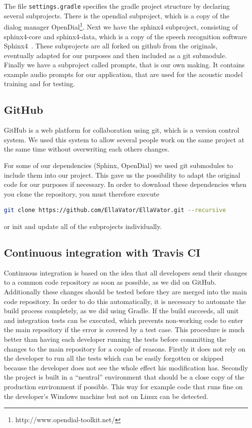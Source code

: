 \documentclass[a4paper, 12pt]{article}
\begin{document}
The file \texttt{settings.gradle} specifies the gradle project structure by declaring several subprojects.
There is the opendial subproject, which is a copy of the dialog manager OpenDial\footnote{http://www.opendial-toolkit.net/}.
Next we have the sphinx4 subproject, consisting of sphinx4-core and sphinx4-data, which is a copy of the speech recognition software Sphinx4~\cite{Walker:2004:SFO:1698193}.
These subprojects are all forked on github from the originals, eventually adapted for our purposes and then included as a git submodule.
Finally we have a subproject called prompts, that is our own making.
It contains example audio prompts for our application, that are used for the acoustic model training and for testing.

\subsection{GitHub}
GitHub is a web platform for collaboration using git, which is a version control system. 
We used this system to allow several people work on the same project at the same time without overwriting each others changes.

For some of our dependencies (Sphinx, OpenDial) we used git submodules to include them into our project. 
This gave us the possibility to adapt the original code for our purposes if necessary.
In order to download these dependencies when you clone the repository, you must therefore execute
\begin{lstlisting}[language=bash]
git clone https://github.com/EllaVator/EllaVator.git --recursive
\end{lstlisting}
or init and update all of the subprojects individually.
\subsection{Continuous integration with Travis CI}

Continuous integration is based on the idea that all developers send their changes to a common code repository as soon as possible, as we did on GitHub. 
Additionally these changes should be tested before they are merged into the main code repository. 
In order to do this automatically, it is necessary to automate the build process completely, as we did using Gradle.
If the build succeeds, all unit and integration tests can be executed, which prevents non-working code to enter the main repository if the error is covered by a test case.
This procedure is much better than having each developer running the tests before committing the changes to the main repository for a couple of reasons.
Firstly it does not rely on the developer to run all the tests which can be easily forgotten or skipped because the developer does not see the whole effect his modification has.
Secondly the project is built in a “neutral” environment that should be a close copy of the production environment if possible. 
This way for example code that runs fine on the developer's Windows machine but not on Linux can be detected.
\end{document}

